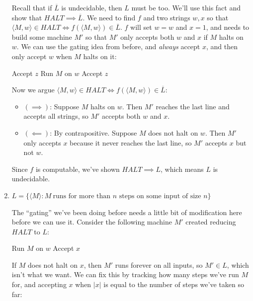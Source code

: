 \documentclass[fleqn]{article}
\begin{document}
\begin{enumerate}
    \begin{answer}
        Recall that if $\overline{L}$ is undecidable, then $L$ must be too. We'll use this fact and show that $HALT \implies \overline{L}$. We need to find $f$ and two strings $w,x$ so that $\langle M, w \rangle \in HALT \iff f(\langle M, w \rangle) \in \overline{L}$. $f$ will set $w=w$ and $x=1$, and needs to build some machine $M'$ so that $M'$ only accepts both $w$ and $x$ if $M$ halts on $w$. We can use the gating idea from before, and \textit{always} accept $x$, and then only accept $w$ when $M$ halts on it:
        \begin{algorithmic}
                    \State Accept $z$
                \EndIf
                \State Run $M$ on $w$
                \State Accept $z$
            \EndFunction
        \end{algorithmic}
        Now we argue $\langle M, w \rangle \in HALT \iff f(\langle M, w \rangle) \in \overline{L}$:
        \begin{itemize}
            \item $(\implies)$: Suppose $M$ halts on $w$. Then $M'$ reaches the last line and accepts all strings, so $M'$ accepts both $w$ and $x$.
            \item $(\impliedby)$: By contrapositive. Suppose $M$ does not halt on $w$. Then $M'$ only accepts $x$ because it never reaches the last line, so $M'$ accepts $x$ but not $w$.
        \end{itemize}
        Since $f$ is computable, we've shown $HALT \implies L$, which means $L$ is undecidable.
    \end{answer}
    \item $L = \{\langle M \rangle : M~\text{runs for more than $n$ steps on some input of size $n$}\}$
    \begin{answer}
        The ``gating'' we've been doing before needs a little bit of modification here before we can use it. Consider the following machine $M'$ created reducing $HALT$ to $L$:
        \begin{algorithmic}
                \State Run $M$ on $w$
                \State Accept $x$
            \EndFunction
        \end{algorithmic}
        If $M$ does not halt on $x$, then $M'$ runs forever on all inputs, so $M' \in L$, which isn't what we want. We can fix this by tracking how many steps we've run $M$ for, and accepting $x$ when $|x|$ is equal to the number of steps we've taken so far:

\end{answer}
\end{enumerate}
\end{document}
